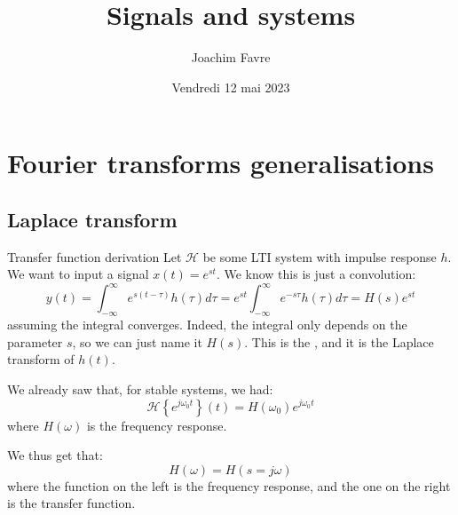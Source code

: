 \documentclass[a4paper]{article}
\title{Signals and systems}
\author{Joachim Favre}
\date{Vendredi 12 mai 2023}
\begin{document}
\maketitle


\section{Fourier transforms generalisations}

\subsection{Laplace transform}

\begin{parag}{Transfer function derivation}
    Let $\mathcal{H}$ be some LTI system with impulse response $h$. We want to input a signal $x\left(t\right) = e^{st}$. We know this is just a convolution: 
    \[y\left(t\right) = \int_{-\infty}^{\infty} e^{s\left(t - \tau\right)} h\left(\tau\right) d\tau = e^{st} \int_{-\infty}^{\infty} e^{- s \tau}h\left(\tau\right)d \tau = H\left(s\right) e^{s t}\]
    assuming the integral converges. Indeed, the integral only depends on the parameter $s$, so we can just name it $H\left(s\right)$. This is the , and it is the Laplace transform of $h\left(t\right)$.

    We already saw that, for stable systems, we had: 
    \[\mathcal{H}\left\{e^{j \omega_0 t}\right\}\left(t\right) = H\left(\omega_0\right) e^{j \omega_0 t}\]
    where $H\left(\omega\right)$ is the frequency response.

    We thus get that: 
    \[H\left(\omega\right) = H\left(s = j \omega\right)\]
    where the function on the left is the frequency response, and the one on the right is the transfer function.
\end{parag}
\end{document}
